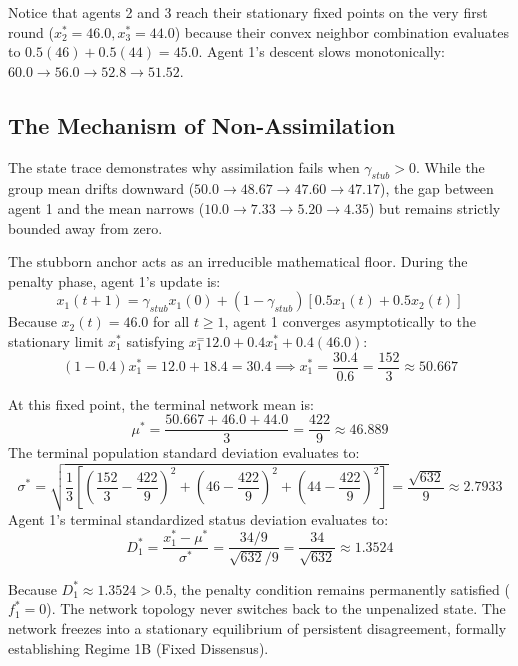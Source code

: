 Notice that agents 2 and 3 reach their stationary fixed points on the very first round ($x_2^* = 46.0, x_3^* = 44.0$) because their convex neighbor combination evaluates to $0.5(46) + 0.5(44) = 45.0$\cite{acemoglu2013opinion}. Agent 1's descent slows monotonically: $60.0 \to 56.0 \to 52.8 \to 51.52$\cite{degroot1974reaching}.

\subsection{The Mechanism of Non-Assimilation}
The state trace demonstrates why assimilation fails when $\gamma_{stub} > 0$\cite{degroot1974reaching}. While the group mean drifts downward ($50.0 \to 48.67 \to 47.60 \to 47.17$), the gap between agent 1 and the mean narrows ($10.0 \to 7.33 \to 5.20 \to 4.35$) but remains strictly bounded away from zero\cite{degroot1974reaching,acemoglu2013opinion}.

The stubborn anchor acts as an irreducible mathematical floor\cite{degroot1974reaching}. During the penalty phase, agent 1's update is\cite{degroot1974reaching}: $$x_1(t+1) = \gamma_{stub} x_1(0) + (1 - \gamma_{stub}) [0.5 x_1(t) + 0.5 x_2(t)]$$ Because $x_2(t) = 46.0$ for all $t \ge 1$, agent 1 converges asymptotically to the stationary limit $x_1^*$ satisfying $x_1^ = 12.0 + 0.4 x_1^* + 0.4(46.0)$\cite{degroot1974reaching,acemoglu2013opinion}: $$(1 - 0.4) x_1^* = 12.0 + 18.4 = 30.4 \implies x_1^* = \frac{30.4}{0.6} = \frac{152}{3} \approx 50.667$$

At this fixed point, the terminal network mean is\cite{degroot1974reaching,acemoglu2013opinion}: $$\mu^* = \frac{50.667 + 46.0 + 44.0}{3} = \frac{422}{9} \approx 46.889$$ The terminal population standard deviation evaluates to\cite{acemoglu2013opinion}: $$\sigma^* = \sqrt{\frac{1}{3} \left[ \left( \frac{152}{3} - \frac{422}{9} \right)^2 + \left( 46 - \frac{422}{9} \right)^2 + \left( 44 - \frac{422}{9} \right)^2 \right]} = \frac{\sqrt{632}}{9} \approx 2.7933$$ Agent 1's terminal standardized status deviation evaluates to\cite{acemoglu2013opinion}: $$D_1^* = \frac{x_1^* - \mu^*}{\sigma^*} = \frac{34/9}{\sqrt{632}/9} = \frac{34}{\sqrt{632}} \approx 1.3524$$

Because $D_1^* \approx 1.3524 > 0.5$, the penalty condition remains permanently satisfied ($f_1^* = 0$)\cite{acemoglu2013opinion}. The network topology never switches back to the unpenalized state\cite{acemoglu2013opinion}. The network freezes into a stationary equilibrium of persistent disagreement, formally establishing Regime 1B (Fixed Dissensus)\cite{acemoglu2013opinion}.

